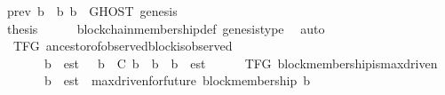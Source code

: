 \begin{isabellebody}
\ {\isacartoucheopen}prev\ b\ {\isasymdownharpoonright}\ b{\isacharprime}{\isacharprime}{\isacartoucheclose}\ {\isacartoucheopen}b{\isacharprime}{\isacharprime}\ {\isasymin}\ GHOST\ {\isacharparenleft}{\isacharbraceleft}genesis{\isacharbraceright}{\isacharcomma}\ {\isasymsigma}{\isacharparenright}{\isacartoucheclose}\ \ \ \ \ \ \ \ \ \ \isanewline
\ \ \ \ \ \ \ \ \ \ \isamarkupfalse%
\isanewline
\ \ \ \ \ \ \isamarkupfalse%
\isanewline
\ \ \ \ \isamarkupfalse%
\isanewline
\ \ \isamarkupfalse%
\isanewline
\ \ \isamarkupfalse%
\ \isamarkupfalse%
\ {\isacharquery}thesis\isanewline
\ \ \ \ \isamarkupfalse%
\ blockchain{\isacharunderscore}membership{\isacharunderscore}def\ genesis{\isacharunderscore}type{\isacharparenleft}{}{\isacharparenright}\ \isamarkupfalse%
\ auto\isanewline
{}\isamarkupfalse%
%
\endisatagproof
{\isafoldproof}%
%
\isadelimproof
\ \ \ \ \isanewline
%
\endisadelimproof
\isanewline
{}\isamarkupfalse%
\ {\isacharparenleft}\ TFG{\isacharparenright}\ ancestor{\isacharunderscore}of{\isacharunderscore}observed{\isacharunderscore}block{\isacharunderscore}is{\isacharunderscore}observed\ {\isacharcolon}\isanewline
\ \ {\isachardoublequoteopen}{\isasymforall}\ {\isasymsigma}\ {\isasymin}\ {\isasymSigma}{\isachardot}\ {\isasymforall}\ b\ {\isasymin}\ est\ {\isacharbackquote}{\isasymsigma}{\isachardot}\ {\isasymforall}\ b{\isacharprime}\ {\isasymin}\ C{\isachardot}\ b{\isacharprime}\ {\isasymdownharpoonright}\ b\ {\isasymlongrightarrow}\ b{\isacharprime}\ {\isasymin}\ est\ {\isacharbackquote}{\isasymsigma}{\isachardoublequoteclose}\isanewline
%
\isadelimproof
\ \ %
\endisadelimproof
%
\isatagproof
{}\isamarkupfalse%
%
\endisatagproof
{\isafoldproof}%
%
\isadelimproof
\isanewline
%
\endisadelimproof
\isanewline
{}\isamarkupfalse%
\ {\isacharparenleft}\ TFG{\isacharparenright}\ block{\isacharunderscore}membership{\isacharunderscore}is{\isacharunderscore}max{\isacharunderscore}driven\ {\isacharcolon}\isanewline
\ \ {\isachardoublequoteopen}{\isasymforall}\ {\isasymsigma}\ {\isasymin}\ {\isasymSigma}{\isachardot}\ {\isasymforall}\ b\ {\isasymin}\ est\ {\isacharbackquote}{\isasymsigma}{\isachardot}\ max{\isacharunderscore}driven{\isacharunderscore}for{\isacharunderscore}future\ {\isacharparenleft}block{\isacharunderscore}membership\ b{\isacharparenright}\ {\isasymsigma}{\isachardoublequoteclose}\isanewline
%
\isadelimproof

\end{isabellebody}
